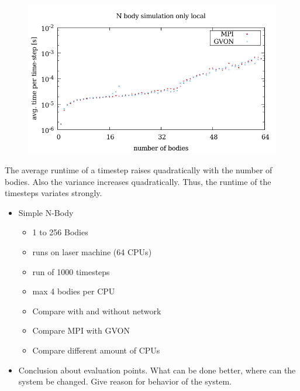 \begin{figure}[H]
  \centering \includegraphics[width=\textwidth]{plots/50_nbody_laser}
  \caption{ }
  \label{fig:nbody_laser}
\end{figure}

The average runtime of a timestep raises quadratically with the number
of bodies. Also the variance increases quadratically. Thus, the runtime
of the timesteps variates strongly.



\begin{itemize}
  \item Simple N-Body
    \begin{itemize}
    \item 1 to 256 Bodies
    \item runs on laser machine (64 CPUs)
    \item run of 1000 timesteps
    \item max 4 bodies per CPU
    \item Compare with and without network
    \item Compare MPI with GVON
    \item Compare different amount of CPUs
    \end{itemize}
\end{itemize}


\begin{itemize}
\item Conclusion about evaluation points. What can
  be done better, where can the system be changed.
  Give reason for behavior of the system.

\end{itemize}

\cleardoublepage

